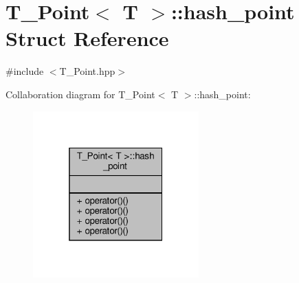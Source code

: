 \hypertarget{structT__Point_1_1hash__point}{}\section{T\+\_\+\+Point$<$ T $>$\+:\+:hash\+\_\+point Struct Reference}
\label{structT__Point_1_1hash__point}


{\ttfamily \#include $<$T\+\_\+\+Point.\+hpp$>$}



Collaboration diagram for T\+\_\+\+Point$<$ T $>$\+:\+:hash\+\_\+point\+:\nopagebreak
\begin{figure}[H]
\begin{center}
\leavevmode
\includegraphics[width=181pt]{structT__Point_1_1hash__point__coll__graph}
\end{center}
\end{figure}

